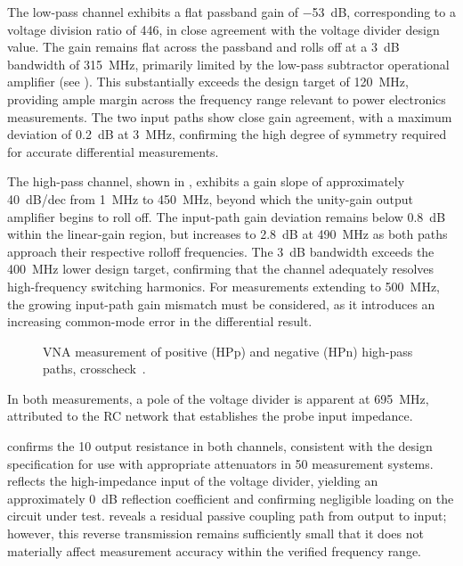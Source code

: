 The low-pass channel exhibits a flat passband gain of \SI{-53}{dB}, corresponding to a voltage division ratio of 446, in close agreement with the voltage divider design value.
The gain remains flat across the passband and rolls off at a \SI{3}{dB} bandwidth of \SI{315}{MHz}, primarily limited by the low-pass subtractor operational amplifier (see ).
This substantially exceeds the design target of \SI{120}{MHz}, providing ample margin across the frequency range relevant to power electronics measurements.
The two input paths show close gain agreement, with a maximum deviation of \SI{0.2}{dB} at \SI{3}{MHz}, confirming the high degree of symmetry required for accurate differential measurements.

The high-pass channel, shown in , exhibits a gain slope of approximately \SI{+40}{dB/dec} from \SI{1}{MHz} to \SI{450}{MHz}, beyond which the unity-gain output amplifier begins to roll off.
The input-path gain deviation remains below \SI{0.8}{dB} within the linear-gain region, but increases to \SI{2.8}{dB} at \SI{490}{MHz} as both paths approach their respective rolloff frequencies.
The \SI{3}{dB} bandwidth exceeds the \SI{400}{MHz} lower design target, confirming that the channel adequately resolves high-frequency switching harmonics.
For measurements extending to \SI{500}{MHz}, the growing input-path gain mismatch must be considered, as it introduces an increasing common-mode error in the differential result.

\begin{figure}[ht]
	\centering
	
	\caption{VNA measurement of positive (HPp) and negative (HPn) high-pass paths, crosscheck~.}\label{fig:VNA_HP}
\end{figure}

In both measurements, a pole of the voltage divider is apparent at \SI{695}{MHz}, attributed to the RC network that establishes the probe input impedance.

 confirms the \SI{10}{\Omega} output resistance in both channels, consistent with the design specification for use with appropriate attenuators in \SI{50}{\Omega} measurement systems.
 reflects the high-impedance input of the voltage divider, yielding an approximately \SI{0}{dB} reflection coefficient and confirming negligible loading on the circuit under test.
 reveals a residual passive coupling path from output to input; however, this reverse transmission remains sufficiently small that it does not materially affect measurement accuracy within the verified frequency range.














